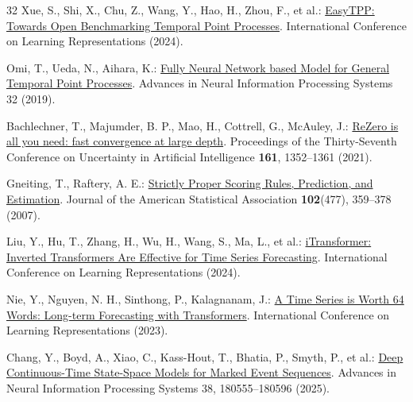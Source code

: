 \documentclass[runningheads]{llncs}
\begin{document}
\begin{thebibliography}{32}
Xue, S., Shi, X., Chu, Z., Wang, Y., Hao, H., Zhou, F., et al.: \href{https://openreview.net/forum?id=PJwAkg0z7h}{EasyTPP: Towards Open Benchmarking Temporal Point Processes}. International Conference on Learning Representations (2024).

Omi, T., Ueda, N., Aihara, K.: \href{https://proceedings.neurips.cc/paper/2019/hash/39e4973ba3321b80f37d9b55f63ed8b8-Abstract.html}{Fully Neural Network based Model for General Temporal Point Processes}. Advances in Neural Information Processing Systems 32 (2019).

Bachlechner, T., Majumder, B. P., Mao, H., Cottrell, G., McAuley, J.: \href{https://proceedings.mlr.press/v161/bachlechner21a.html}{ReZero is all you need: fast convergence at large depth}. Proceedings of the Thirty-Seventh Conference on Uncertainty in Artificial Intelligence \textbf{161}, 1352--1361 (2021).

Gneiting, T., Raftery, A. E.: \href{https://doi.org/10.1198/016214506000001437}{Strictly Proper Scoring Rules, Prediction, and Estimation}. Journal of the American Statistical Association \textbf{102}(477), 359--378 (2007). 

Liu, Y., Hu, T., Zhang, H., Wu, H., Wang, S., Ma, L., et al.: \href{https://proceedings.iclr.cc/paper_files/paper/2024/hash/2ea18fdc667e0ef2ad82b2b4d65147ad-Abstract-Conference.html}{iTransformer: Inverted Transformers Are Effective for Time Series Forecasting}. International Conference on Learning Representations (2024).

Nie, Y., Nguyen, N. H., Sinthong, P., Kalagnanam, J.: \href{https://openreview.net/forum?id=Jbdc0vTOcol}{A Time Series is Worth 64 Words: Long-term Forecasting with Transformers}. International Conference on Learning Representations (2023).

Chang, Y., Boyd, A., Xiao, C., Kass-Hout, T., Bhatia, P., Smyth, P., et al.: \href{https://proceedings.neurips.cc/paper_files/paper/2025/hash/ee39348acc798915d2d15a8bbbd417b8-Abstract-Conference.html}{Deep Continuous-Time State-Space Models for Marked Event Sequences}. Advances in Neural Information Processing Systems 38, 180555--180596 (2025). 

\end{thebibliography}
\end{document}
